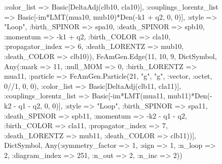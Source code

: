 \documentclass{revtex4}
\begin{document}
\begin{figure}[!htb]
\begin{center}
{:color_list => Basic[DeltaAdj(clb10, cla10)], :couplings_lorentz_list => Basic[-im*LMT(mua10, mub10)*Den(-k1 + q2, 0, 0)], :style => "Loop", :birth_SPINOR => spa10, :death_SPINOR => spb10, :momentum => -k1 + q2, :birth_COLOR => cla10, :propagator_index => 6, :death_LORENTZ => mub10, :death_COLOR => clb10)), FeAmGen.Edge(11, 10, 9, Dict{Symbol, Any}(:mark => 11, :null_MOM => 0, :birth_LORENTZ => mua11, :particle => FeAmGen.Particle(21, "g", "g", :vector, :octet, 0//1, 0, 0), :color_list => Basic[DeltaAdj(clb11, cla11)], :couplings_lorentz_list => Basic[-im*LMT(mua11, mub11)*Den(-k2 - q1 - q2, 0, 0)], :style => "Loop", :birth_SPINOR => spa11, :death_SPINOR => spb11, :momentum => -k2 - q1 - q2, :birth_COLOR => cla11, :propagator_index => 7, :death_LORENTZ => mub11, :death_COLOR => clb11))], Dict{Symbol, Any}(:symmetry_factor => 1, :sign => 1, :n_loop => 2, :diagram_index => 251, :n_out => 2, :n_inc => 2)) 
}
\end{center}
\end{figure}
\end{document}

